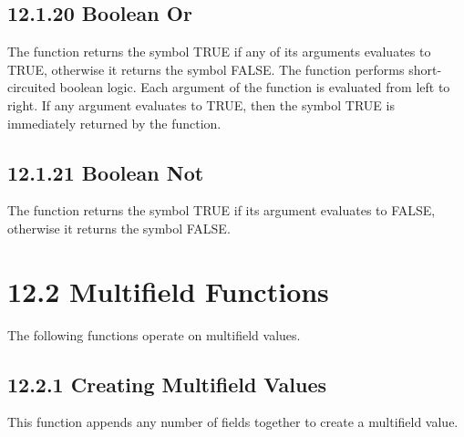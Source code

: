 \documentclass[letterpaper,10pt,english]{sphinxmanual}
\begin{document}
\begin{sphinxVerbatim}[commandchars=\\\{\}]
 
\end{sphinxVerbatim}


\subsection{12.1.20 Boolean Or}
\label{\detokenize{actions:boolean-or}}
The  function returns the symbol TRUE if any of its arguments
evaluates to TRUE, otherwise it returns the symbol FALSE. The 
function performs short-circuited boolean logic. Each argument of the
function is evaluated from left to right. If any argument evaluates to
TRUE, then the symbol TRUE is immediately returned by the function.


\begin{sphinxVerbatim}[commandchars=\\\{\}]
 
\end{sphinxVerbatim}


\subsection{12.1.21 Boolean Not}
\label{\detokenize{actions:boolean-not}}
The  function returns the symbol TRUE if its argument evaluates
to FALSE, otherwise it returns the symbol FALSE.


\begin{sphinxVerbatim}[commandchars=\\\{\}]
 
\end{sphinxVerbatim}


\section{12.2 Multifield Functions}
\label{\detokenize{actions:multifield-functions}}
The following functions operate on multifield values.


\subsection{12.2.1 Creating Multifield Values}
\label{\detokenize{actions:creating-multifield-values}}
This function appends any number of fields together to create a
multifield value.
\end{document}
